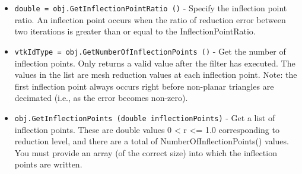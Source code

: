 \begin{itemize}
\item  \verb|double = obj.GetInflectionPointRatio ()| -  Specify the inflection point ratio. An inflection point occurs
 when the ratio of reduction error between two iterations is greater
 than or equal to the InflectionPointRatio.

\item  \verb|vtkIdType = obj.GetNumberOfInflectionPoints ()| -  Get the number of inflection points. Only returns a valid value after
 the filter has executed.  The values in the list are mesh reduction
 values at each inflection point. Note: the first inflection point always
 occurs right before non-planar triangles are decimated (i.e., as the
 error becomes non-zero).

\item  \verb|obj.GetInflectionPoints (double inflectionPoints)| -  Get a list of inflection points. These are double values 0 < r <= 1.0 
 corresponding to reduction level, and there are a total of
 NumberOfInflectionPoints() values. You must provide an array (of
 the correct size) into which the inflection points are written.

\end{itemize}
